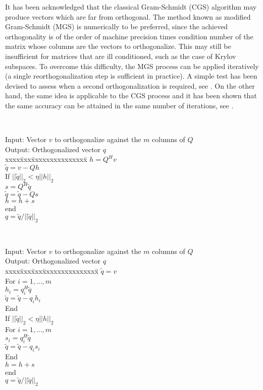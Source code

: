 	It has been acknowledged that the classical Gram-Schmidt (CGS) algorithm may produce vectors which are far from orthogonal. The method known as modified Gram-Schmidt (MGS) is numerically to be preferred, since the achieved orthogonality is of the order of machine precision times condition number of the matrix whose columns are the vectors to orthogonalize. This may still be insufficient for matrices that are ill conditioned, such as the case of Krylov subspaces. To overcome this difficulty, the MGS process can be applied iteratively (a single reorthogonalization step is sufficient in practice). A simple test has been devised to assess when a second orthogonalization is required, see \citep{Daniel:1976:RSA}. On the other hand, the same idea is applicable to the CGS process and it has been shown that the same accuracy can be attained in the same number of iterations, see \citep{Hoffmann:1989:IAG}.

\begin{algorithm}~\rm
\begin{tabbing}
Input: Vector $v$ to orthogonalize against the $m$ columns of $Q$ \\
Output: Orthogonalized vector $q$ \\
xxxx\=xxx\=xxxxxxxxxxxxxxx\=\kill
\> $h=Q^Hv$\\
\> $\tilde{q}=v-Qh$\\
\> If $||\tilde{q}||_2<\eta||h||_2$\\
\> \> $s=Q^H\tilde{q}$\\
\> \> $\tilde{q}=\tilde{q}-Qs$\\
\> \> $h=h+s$\\
\> end \\
\> $q=\tilde{q}/||\tilde{q}||_2$
\end{tabbing}
\end{algorithm}

\begin{algorithm}~\rm
\begin{tabbing}
Input: Vector $v$ to orthogonalize against the $m$ columns of $Q$ \\
Output: Orthogonalized vector $q$ \\
xxxx\=xxx\=xxx\=xxxxxxxxxxxxxxx\=\kill
\> $\tilde{q}=v$\\
\> For $i=1,\ldots,m$\\
\> \> $h_i=q_i^H\tilde{q}$\\
\> \> $\tilde{q}=\tilde{q}-q_ih_i$\\
\> End\\
\> If $||\tilde{q}||_2<\eta||h||_2$\\
\> \> For $i=1,\ldots,m$\\
\> \> \> $s_i=q_i^H\tilde{q}$\\
\> \> \> $\tilde{q}=\tilde{q}-q_is_i$\\
\> \> End\\
\> \> $h=h+s$\\
\> end \\
\> $q=\tilde{q}/||\tilde{q}||_2$
\end{tabbing}
\end{algorithm}

